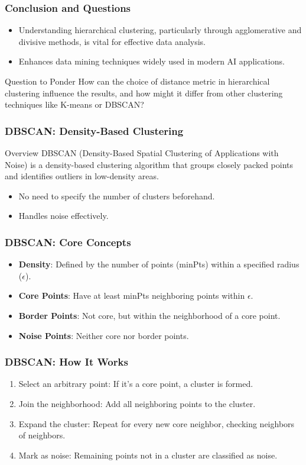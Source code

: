 \documentclass[aspectratio=169]{beamer}
\begin{document}
\begin{frame}[fragile]
    \frametitle{Conclusion and Questions}
    \begin{itemize}
        \item Understanding hierarchical clustering, particularly through agglomerative and divisive methods, is vital for effective data analysis.
        \item Enhances data mining techniques widely used in modern AI applications.
    \end{itemize}
    \begin{block}{Question to Ponder}
        How can the choice of distance metric in hierarchical clustering influence the results, and how might it differ from other clustering techniques like K-means or DBSCAN?
    \end{block}
\end{frame}

\begin{frame}
  \frametitle{DBSCAN: Density-Based Clustering}
  \begin{block}{Overview}
    DBSCAN (Density-Based Spatial Clustering of Applications with Noise) is a density-based clustering algorithm that groups closely packed points and identifies outliers in low-density areas.
  \end{block}
  \begin{itemize}
    \item No need to specify the number of clusters beforehand.
    \item Handles noise effectively.
  \end{itemize}
\end{frame}

\begin{frame}
  \frametitle{DBSCAN: Core Concepts}
  \begin{itemize}
    \item \textbf{Density}: Defined by the number of points (minPts) within a specified radius ($\epsilon$).
    \item \textbf{Core Points}: Have at least minPts neighboring points within $\epsilon$.
    \item \textbf{Border Points}: Not core, but within the neighborhood of a core point.
    \item \textbf{Noise Points}: Neither core nor border points.
  \end{itemize}
\end{frame}

\begin{frame}
  \frametitle{DBSCAN: How It Works}
  \begin{enumerate}
    \item Select an arbitrary point: If it’s a core point, a cluster is formed.
    \item Join the neighborhood: Add all neighboring points to the cluster.
    \item Expand the cluster: Repeat for every new core neighbor, checking neighbors of neighbors.
    \item Mark as noise: Remaining points not in a cluster are classified as noise.
  \end{enumerate}
\end{frame}
\end{document}
